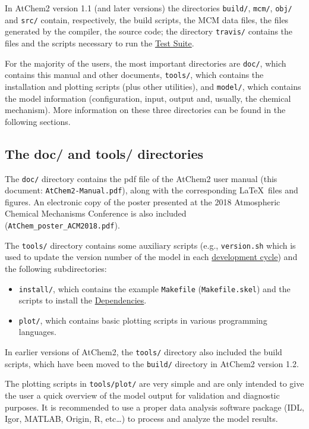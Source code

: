 In AtChem2 version 1.1 (and later versions) the directories
\texttt{build/}, \texttt{mcm/}, \texttt{obj/} and \texttt{src/}
contain, respectively, the build scripts, the MCM data files, the
files generated by the compiler, the source code; the directory
\texttt{travis/} contains the files and the scripts necessary to run
the \hyperref[sec:test-suite]{Test Suite}.

For the majority of the users, the most important directories are
\texttt{doc/}, which contains this manual and other documents,
\texttt{tools/}, which contains the installation and plotting scripts
(plus other utilities), and \texttt{model/}, which contains the model
information (configuration, input, output and, usually, the chemical
mechanism). More information on these three directories can be found
in the following sections.

\subsection{The doc/ and tools/ directories} \label{subsec:doc-tools-directories}

The \texttt{doc/} directory contains the pdf file of the AtChem2 user
manual (this document: \texttt{AtChem2-Manual.pdf}), along with the
corresponding \LaTeX\ files and figures. An electronic copy of the
poster presented at the 2018 Atmospheric Chemical Mechanisms
Conference \citep{sommariva_2018} is also included
(\texttt{AtChem\_poster\_ACM2018.pdf}).

The \texttt{tools/} directory contains some auxiliary scripts (e.g.,
\texttt{version.sh} which is used to update the version number of the
model in each \hyperref[ch:development]{development cycle}) and the
following subdirectories:

\begin{itemize}
\item \texttt{install/}, which contains the example \texttt{Makefile}
  (\texttt{Makefile.skel}) and the scripts to install the
  \hyperref[sec:dependencies]{Dependencies}.
\item \texttt{plot/}, which contains basic plotting scripts in various
  programming languages.
\end{itemize}

In earlier versions of AtChem2, the \texttt{tools/} directory also
included the build scripts, which have been moved to the
\texttt{build/} directory in AtChem2 version 1.2.

The plotting scripts in \texttt{tools/plot/} are very simple and are
only intended to give the user a quick overview of the model output
for validation and diagnostic purposes. It is recommended to use a
proper data analysis software package (IDL, Igor, MATLAB, Origin, R,
etc\ldots) to process and analyze the model results.

